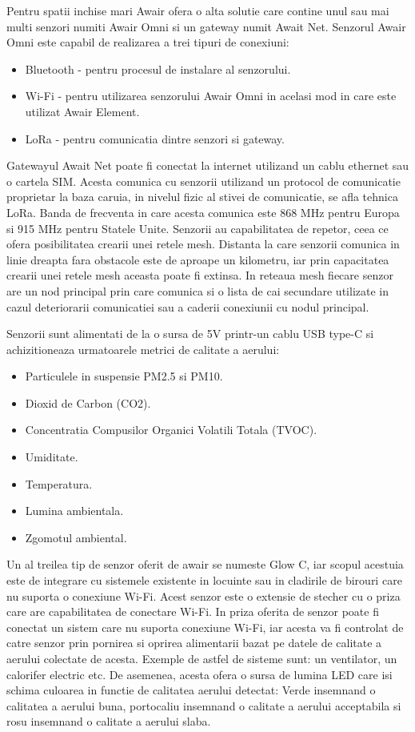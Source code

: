 Pentru spatii inchise mari Awair ofera o alta solutie care contine unul sau mai multi senzori numiti Awair Omni si un gateway numit Await Net. Senzorul Awair 
Omni este capabil de realizarea a trei tipuri de conexiuni:
\begin{itemize}
	\item Bluetooth - pentru procesul de instalare al senzorului.
	\item Wi-Fi - pentru utilizarea senzorului Awair Omni in acelasi mod in care este utilizat Awair Element.
	\item LoRa - pentru comunicatia dintre senzori si gateway.
\end{itemize}
Gatewayul Await Net poate fi conectat la internet utilizand un cablu ethernet sau o cartela SIM. Acesta comunica cu senzorii utilizand un protocol de comunicatie 
proprietar la baza caruia, in nivelul fizic al stivei de comunicatie, se afla tehnica LoRa. Banda de frecventa in care acesta comunica este 868 MHz pentru Europa 
si 915 MHz pentru Statele Unite. Senzorii au capabilitatea de repetor, ceea ce ofera posibilitatea crearii unei retele mesh. Distanta la care senzorii comunica 
in linie dreapta fara obstacole este de aproape un kilometru, iar prin capacitatea crearii unei retele mesh aceasta poate fi extinsa. In reteaua mesh fiecare 
senzor are un nod principal prin care comunica si o lista de cai secundare utilizate in cazul deteriorarii comunicatiei sau a caderii conexiunii cu nodul principal.

Senzorii sunt alimentati de la o sursa de 5V printr-un cablu USB type-C si achizitioneaza urmatoarele metrici de calitate a aerului:
\begin{itemize}
	\item Particulele in suspensie PM2.5 si PM10.
	\item Dioxid de Carbon (CO2).
	\item Concentratia Compusilor Organici Volatili Totala (TVOC).
	\item Umiditate.
	\item Temperatura.
	\item Lumina ambientala.
	\item Zgomotul ambiental.
\end{itemize}

Un al treilea tip de senzor oferit de awair se numeste Glow C, iar scopul acestuia este de integrare cu sistemele existente in locuinte sau in cladirile de birouri 
care nu suporta o conexiune Wi-Fi. Acest senzor este o extensie de stecher cu o priza care are capabilitatea de conectare Wi-Fi. In priza oferita de senzor poate fi 
conectat un sistem care nu suporta conexiune Wi-Fi, iar acesta va fi controlat de catre senzor prin pornirea si oprirea alimentarii bazat pe datele de calitate a 
aerului colectate de acesta. Exemple de astfel de sisteme sunt: un ventilator, un calorifer electric etc. De asemenea, acesta ofera o sursa de lumina LED care isi 
schima culoarea in functie de calitatea aerului detectat: Verde insemnand o calitatea a aerului buna, portocaliu insemnand o calitate a aerului acceptabila si rosu 
insemnand o calitate a aerului slaba.

